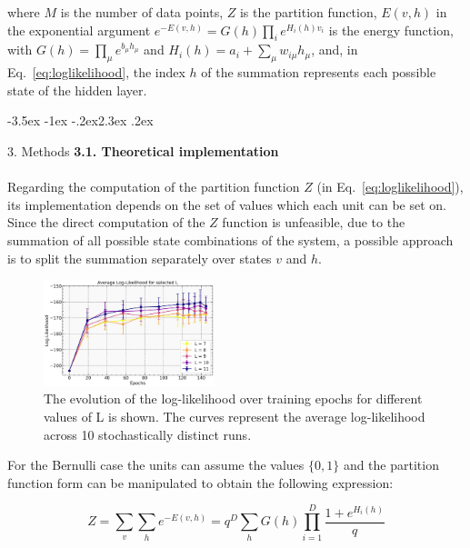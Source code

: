 \documentclass[prl,twocolumn]{revtex4-1}
\makeatletter
\renewcommand{\section}{\@startsection{section}{1}{\z@}%
	{-3.5ex \@plus -1ex \@minus -.2ex}{2.3ex \@plus.2ex}%
	{\normalfont\bfseries\raggedright}}
\makeatother
\begin{document}
where $M$ is the number of data points, $Z$ is the partition function, $E(v,h)$ in the exponential argument $e^{-E(v,h)}=G(h)\prod_{i}{e^{H_i(h)v_i}}$ is the energy function, with $G(h)=\prod_{\mu}{e^{b_{\mu}h_{\mu}}}$ and $H_i(h)=a_i+\sum_{\mu}w_{i\mu}h_\mu$, and, in Eq.~\ref{eq:loglikelihood}, the index $h$ of the summation represents each possible state of the hidden layer.


\section{3. Methods}
\noindent\textbf{3.1. Theoretical implementation}
\\
\\
Regarding the computation of the partition function $Z$ (in Eq.~\ref{eq:loglikelihood}), its implementation depends on the set of values which each unit can be set on. Since the direct computation of the $Z$ function is unfeasible, due to the summation of all possible state combinations of the system, a possible approach is to split the summation separately over states $v$ and $h$.

\begin{figure}[!tb]
	\includegraphics[width=0.44\textwidth]{L_of_epochs.jpg}
	\caption{The evolution of the log-likelihood over training epochs for different values of L is shown. The curves represent the average log-likelihood across 10 stochastically distinct runs.}
	\label{fig:L_of_epochs}
\end{figure}

For the Bernulli case the units can assume the values $\{0,1\}$ and the partition function form can be manipulated to obtain the following expression:

\begin{equation}
	Z=\sum_v\sum_h{e^{-E(v,h)}}=q^D\sum_h{G(h)\prod_{i=1}^D{\frac{1+e^{H_i(h)}}{q}}}
	\label{eq:Z_function_bernulli}
\end{equation}
\end{document}
